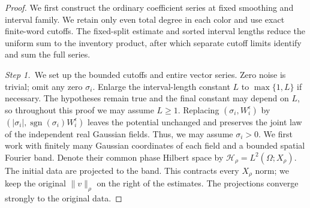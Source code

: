 \documentclass[12pt,oneside,openany]{book}
\numberwithin{equation}{section}
\theoremstyle{nogostyle}
\theoremstyle{definition}
\begin{document}
\begin{proof}
  We first construct the ordinary coefficient series at fixed smoothing and
  interval family. We retain only even total degree in each color and use
  exact finite-word cutoffs. The fixed-split estimate and sorted interval
  lengths reduce the uniform sum to the inventory product, after which
  separate cutoff limits identify and sum the full series.


  \medskip
  \noindent\textit{Step 1.~}We set up the bounded cutoffs and entire vector
  series.
  Zero noise is trivial; omit any zero $\sigma_i$. Enlarge the interval-length
  constant $L$ to $\max\{1,L\}$ if necessary. The hypotheses remain true and the
  final constant may depend on $L$, so throughout this proof we may assume $L
  \ge 1$. Replacing $(\sigma_i,W_i^\epsilon)$ by
  $(|\sigma_i|,\operatorname{sgn}(\sigma_i)W_i^\epsilon)$ leaves the potential
  unchanged and preserves the joint law of the independent real Gaussian fields.
  Thus, we may assume $\sigma_i > 0$. We first work with finitely many Gaussian
  coordinates of each field and a bounded spatial Fourier band. Denote their
  common phase Hilbert space by $\mathcal{H}_\rho = L^2(\Omega;X_\rho)$. The
  initial data are projected to the band. This contracts every $X_\rho$ norm; we
  keep the original $\|v\|_\rho$ on the right of the estimates. The projections
  converge strongly to the original data.


\end{proof}
\end{document}
